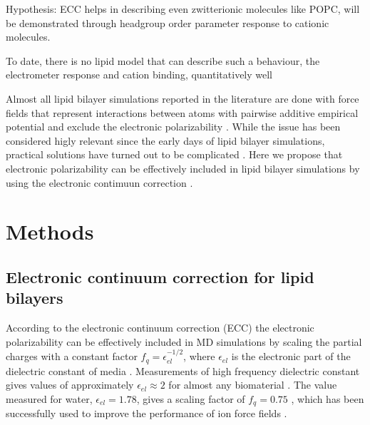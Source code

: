 \documentclass[aip,jcp,twocolumn]{revtex4}
\begin{document}
Hypothesis: ECC helps in describing even zwitterionic molecules like POPC, will be demonstrated through headgroup order parameter response to cationic molecules.

To date, there is no lipid model that can describe such a behaviour, 
the electrometer response and cation binding, quantitatively well~\cite{catte16}

Almost all lipid bilayer simulations reported in the literature 
are done with force fields that represent interactions between atoms
with pairwise additive empirical potential and exclude the electronic 
polarizability \cite{SOME_review, FF_papers}. While the issue has been 
considered higly relevant since the early days of lipid bilayer simulations,
practical solutions have turned out to be complicated \cite{??}.
Here we propose that electronic polarizability can be effectively included
in lipid bilayer simulations by using the electronic contimuun correction \cite{leontyev11}.


\section{Methods}

\subsection{Electronic continuum correction for lipid bilayers}
According to the electronic continuum correction (ECC) the electronic
polarizability can be effectively included in MD simulations by scaling
the partial charges with a constant factor $f_q = \epsilon _{el} ^{-1/2}$, 
where $\epsilon _{el}$ is the electronic part of the dielectric constant of 
media \cite{leontyev11}. Measurements of high frequency 
dielectric constant gives values of approximately $\epsilon _{el} \approx 2$ 
for almost any biomaterial \cite{some_original_work, leontyev11}. %
The value measured for water, $\epsilon _{el} = 1.78$, gives 
a scaling factor of $f_q = 0.75$ \cite{some_orig_source, leontyev11}, which has been
successfully used to improve the performance of ion force fields \cite{kohagen14,kohagen16,??}. 
\end{document}
